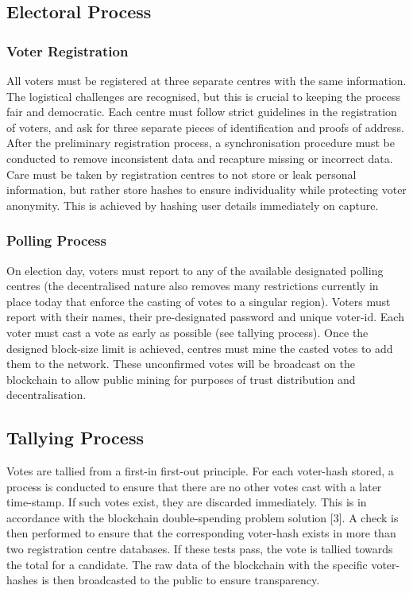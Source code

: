 \documentclass{article}
\begin{document}
    \subsection{Electoral Process}
    \subsubsection{Voter Registration}
    All voters must be registered at three separate centres with the same information. The logistical challenges are recognised, but this is crucial to keeping the process fair and democratic. Each centre must follow strict guidelines in the registration of voters, and ask for three separate pieces of identification and proofs of address. After the preliminary registration process, a synchronisation procedure must be conducted to remove inconsistent data and recapture missing or incorrect data. Care must be taken by registration centres to not store or leak personal information, but rather store hashes to ensure individuality while protecting voter anonymity. This is achieved by hashing user details immediately on capture.
    \subsubsection{Polling Process}
    On election day, voters must report to any of the available designated polling centres (the decentralised nature also removes many restrictions currently in place today that enforce the casting of votes to a singular region). Voters must report with their names, their pre-designated password and unique voter-id. Each voter must cast a vote as early as possible (see tallying process). Once the designed block-size limit is achieved, centres must mine the casted votes to add them to the network. These unconfirmed votes will be broadcast on the blockchain to allow public mining for purposes of trust distribution and decentralisation.
    \subsection{Tallying Process}
    Votes are tallied from a first-in first-out principle. For each voter-hash stored, a process is conducted to ensure that there are no other votes cast with a later time-stamp. If such votes exist, they are discarded immediately. This is in accordance with the blockchain double-spending problem solution [3]. A check is then performed to ensure that the corresponding voter-hash exists in more than two registration centre databases. If these tests pass, the vote is tallied towards the total for a candidate.
    The raw data of the blockchain with the specific voter-hashes is then broadcasted to the public to ensure transparency.
\end{document}
